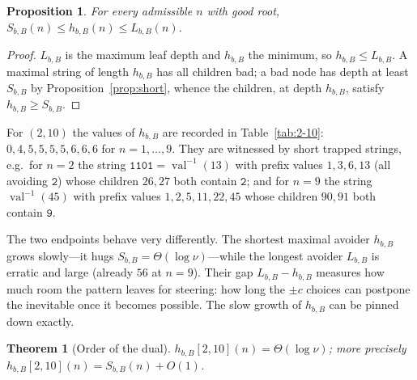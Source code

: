 \documentclass[11pt]{article}
\theoremstyle{plain}
\newtheorem{theorem}{Theorem}
\newtheorem{proposition}{Proposition}
\theoremstyle{definition}
\theoremstyle{remark}
\DeclareMathOperator{\val}{val}
\newcommand{\Lbb}{L_{b,B}}
\newcommand{\Sbb}{S_{b,B}}
\newcommand{\hbb}{h_{b,B}}
\begin{document}
\begin{proposition}\label{prop:sandwich}
For every admissible $n$ with good root, $\Sbb(n)\le \hbb(n)\le \Lbb(n)$.
\end{proposition}

\begin{proof}
$\Lbb$ is the maximum leaf depth and $\hbb$ the minimum, so $\hbb\le\Lbb$. A maximal string of length $\hbb$ has all children bad; a bad node has depth at least $\Sbb$ by Proposition~\ref{prop:short}, whence the children, at depth $\hbb$, satisfy $\hbb\ge\Sbb$.
\end{proof}

For $(2,10)$ the values of $\hbb$ are recorded in Table~\ref{tab:2-10}: $0,4,5,5,5,5,6,6,6$ for $n=1,\dots,9$. They are witnessed by short trapped strings, e.g.\ for $n=2$ the string $\texttt{1101}=\val^{-1}(13)$ with prefix values $1,3,6,13$ (all avoiding $\texttt{2}$) whose children $26,27$ both contain $\texttt{2}$; and for $n=9$ the string $\val^{-1}(45)$ with prefix values $1,2,5,11,22,45$ whose children $90,91$ both contain $\texttt{9}$.

The two endpoints behave very differently. The shortest maximal avoider $\hbb$ grows slowly---it hugs $\Sbb=\Theta(\log\nu)$---while the longest avoider $\Lbb$ is erratic and large (already $56$ at $n=9$). Their gap $\Lbb-\hbb$ measures how much room the pattern leaves for steering: how long the $\pm c$ choices can postpone the inevitable once it becomes possible. The slow growth of $\hbb$ can be pinned down exactly.

\begin{theorem}[Order of the dual]\label{thm:dual}
$\hbb[2,10](n)=\Theta(\log\nu)$; more precisely $\hbb[2,10](n)=\Sbb(n)+O(1)$.
\end{theorem}
\end{document}
